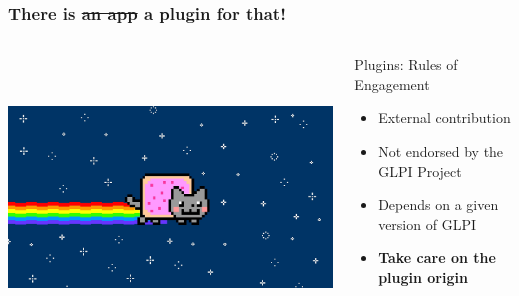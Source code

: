 \documentclass{beamer}
\begin{document}
\begin{frame}

    \frametitle{\textbf{There is \sout{an app} a plugin for that!}}

 \begin{columns}
 \begin{column}{0.45\textwidth}
         \includegraphics[height=7.5cm]{./pics/nyancat.jpg}
 \end{column}
 \begin{column}{0.65\textwidth}
    \begin{block}{Plugins: Rules of Engagement}
        \begin{itemize}
            \item External contribution
            \item Not endorsed by the GLPI Project
            \item Depends on a given version of GLPI
            \pause
            \item \textbf{Take care on the plugin origin}
        \end{itemize}
    \end{block}

 \end{column}
\end{columns}

\end{frame}
\end{document}
